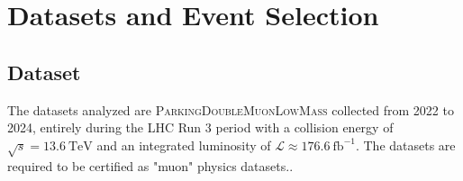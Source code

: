 \documentclass[10pt,twocolumn]{article}
\begin{document}
\section{Datasets and Event Selection}

\subsection{Dataset}

The datasets analyzed are \textsc{ParkingDoubleMuonLowMass} collected from 2022 to 2024, entirely during the LHC Run 3 period with a collision energy of $\sqrt{s} = 13.6 ~\text{TeV}$ and an integrated luminosity of $\mathcal{L}\approx176.6~\text{fb}^{-1}$. The datasets are required to be certified as "muon" physics datasets.\cite{CMS:LUM-22-001}\cite{CMS:DP-LUMI-2023}\cite{CMS:LUMI-PUB}.

\end{document}
